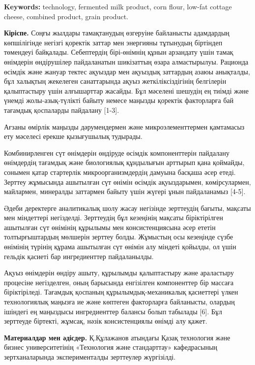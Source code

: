 {\bfseries Keywords:} technology, fermented milk product, corn flour,
low-fat cottage cheese, combined product, grain product.

\begin{multicols}{2}
{\bfseries Кіріспе.} Соңғы жылдары тамақтанудың өзгеруіне байланысты
адамдардың көпшілігінде негізгі қоректік заттар мен энергияны тұтынудың
біртіндеп төмендеуі байқалады. Себептердің бірі-өнімнің құнын арзандату
үшін тамақ өнімдерін өндірушілер пайдаланатын шикізаттың өзара
алмастырылуы. Рационда өсімдік және жануар тектес ақуыздар мен ақуыздық
заттардың азаюы анықталды, бұл халықтың жекелеген санаттарында ақуыз
жеткіліксіздігінің белгілерін қалыптастыру үшін алғышарттар жасайды. Бұл
мәселені шешудің ең тиімді және үнемді жолы-азық-түлікті байыту немесе
маңызды қоректік факторларға бай тағамдық қоспаларды пайдалану
{[}1-3{]}.

Ағзаны өмірлік маңызды дәрумендермен және микроэлементтермен қамтамасыз
ету мәселесі ерекше қызығушылық тудырады.

Комбинирленген сүт өнімдерін өндіруде өсімдік компоненттерін пайдалану
өнімдердің тағамдық және биологиялық құндылығын арттырып қана қоймайды,
сонымен қатар стартерлік микроорганизмдердің дамуына басқаша әсер етеді.
Зерттеу жұмысында ашытылған сүт өнімін өсімдік ақуыздарымен,
көмірсулармен, майлармен, минералды заттармен байыту үшін жүгері ұнын
пайдаланамыз {[}4-5{]}.

Әдеби деректерге аналитикалық шолу жасау негізінде зерттеудің бағыты,
мақсаты мен міндеттері негізделді. Зерттеудің бұл кезеңінің мақсаты
біріктірілген ашытылған сүт өнімінің құрылымы мен консистенциясына әсер
ететін толтырғыштардың мөлшерін зерттеу болды. Жұмыстың осы кезеңінде
сүзбе өнімінің түрінің құрама ашытылған сүт өнімін алу міндеті қойылды,
ол үшін гельдік қасиеті бар ингредиенттер пайдаланылды.

Ақуыз өнімдерін өндіру ашыту, құрылымды қалыптастыру және араластыру
процесіне негізделген, оның барысында енгізілген компоненттер бір
массаға біріктіріледі. Тағамдық қоспаның құрылымдық-механикалық
қасиеттері үлкен технологиялық маңызға ие және көптеген факторларға
байланысты, олардың ішіндегі ең маңыздысы ингредиенттер балансы болып
табылады {[}6{]}. Бұл зерттеуде біртекті, жұмсақ, нәзік консистенциялы
өнімді алу қажет.

{\bfseries Материалдар мен әдісдер.} Қ.Құлажанов атындағы Қазақ технология
және бизнес университетінің «Технология және стандарттау» кафедрасының
зертханаларында эксперименталды зерттеулер жүргізілді.


\end{multicols}
